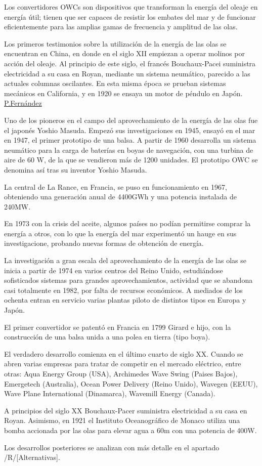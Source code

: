 Los convertidores OWCs son dispositivos que transforman la energía del
oleaje en energía útil; tienen que ser capaces de resistir los embates
del mar y de funcionar eficientemente para las amplias gamas de
frecuencia y amplitud de las olas.

Los primeros testimonios sobre la utilización de la energía de las olas
se encuentran en China, en donde en el siglo XII empiezan a operar
molinos por acción del oleaje. Al principio de este siglo, el francés
Bouchaux-Pacei suministra electricidad a su casa en Royan, mediante un
sistema neumático, parecido a las actuales columnas oscilantes. En esta
misma época se prueban sistemas mecánicos en California, y en 1920 se
ensaya un motor de péndulo en Japón.
\href{http://files.pfernandezdiez.es/EnergiasAlternativas/mar/PDFs/02Olas.pdf}{P.Fernández}

Uno de los pioneros en el campo del aprovechamiento de la energía de las
olas fue el japonés Yoshio Masuda. Empezó sus investigaciones en 1945,
ensayó en el mar en 1947, el primer prototipo de una balsa. A partir de
1960 desarrolla un sistema neumático para la carga de baterías en boyas
de navegación, con una turbina de aire de 60 W, de la que se vendieron
más de 1200 unidades. El prototipo OWC se denomina así tras su inventor
Yoshio Masuda.

La central de La Rance, en Francia, se puso en funcionamiento en 1967,
obteniendo una generación anual de 4400GWh y una potencia instalada de
240MW.

En 1973 con la crisis del aceite, algunos países no podían permitirse
comprar la energía a otros, con lo que la energía del mar experimentó un
hauge en sus investigacione, probando nuevas formas de obtención de
energía.

La investigación a gran escala del aprovechamiento de la energía de las
olas se inicia a partir de 1974 en varios centros del Reino Unido,
estudiándose sofisticados sistemas para grandes aprovechamientos,
actividad que se abandona casi totalmente en 1982, por falta de recursos
económicos. A mediados de los ochenta entran en servicio varias plantas
piloto de distintos tipos en Europa y Japón.

El primer convertidor se patentó en Francia en 1799 Girard e hijo, con
la construcción de una balsa unida a una polea en tierra (tipo boya).

El verdadero desarrollo comienza en el último cuarto de siglo XX. Cuando
se abren varias empresas para tratar de competir en el mercado
eléctrico, entre otras: Aqua Energy Group (USA), Archimedes Wave Swing
(Paises Bajos), Emergetech (Australia), Ocean Power Delivery (Reino
Unido), Wavegen (EEUU), Wave Plane International (Dinamarca), Wavemill
Energy (Canada).

A principios del siglo XX Bouchaux-Pacer suministra electricidad a su
casa en Royan. Asimismo, en 1921 el Instituto Oceanográfico de Monaco
utiliza una bomba accionada por las olas para elevar agua a 60m con una
potencia de 400W.

Los desarrollos posteriores se analizan con más detalle en el apartado
/R/{[}Alternativas{]}.
